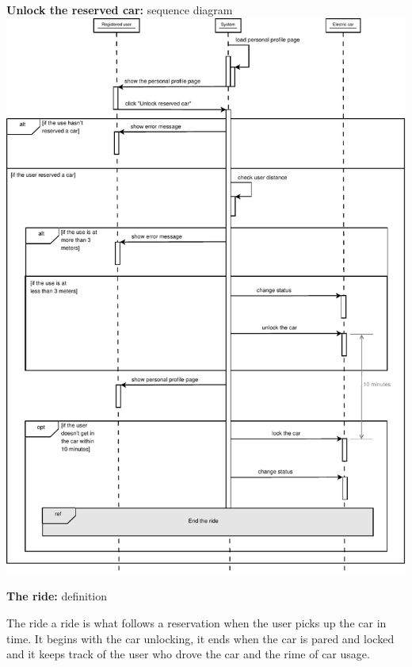 \documentclass{beamer}
\begin{document}
	\begin{frame}{\textbf{Unlock the reserved car:} sequence diagram}
		\includegraphics[height=0.9\textheight]{figures/sdUNLOCK.pdf}
	\end{frame}

	\begin{frame} {\textbf{The ride:} definition}
		\begin{block}{The ride}
		a ride is what follows a reservation when the user picks up the car in time. It begins with the car unlocking, it ends when the car is pared and locked and it keeps track of the user who drove the car and the rime of car usage.
		\end{block}
	\end{frame}
\end{document}
